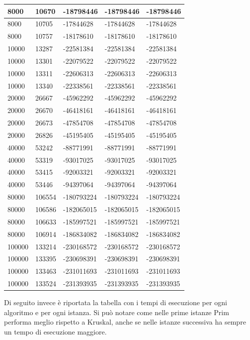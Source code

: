 \begin{longtable}[H]{|p{1.5cm}|p{1.5cm}|p{2cm}|p{3cm}|p{4cm}|}
    8000 & 10670 & -18798446 & -18798446 & -18798446 \\ \hline  
    8000 & 10705 & -17844628 & -17844628 & -17844628 \\ \hline
    8000 & 10757 & -18178610 & -18178610 & -18178610 \\ \hline  
    10000 & 13287 & -22581384 & -22581384 & -22581384 \\ \hline
    10000 & 13301 & -22079522 & -22079522 & -22079522 \\ \hline
    10000 & 13311 & -22606313 & -22606313 & -22606313 \\ \hline
    10000 & 13340 & -22338561 & -22338561 & -22338561 \\ \hline 
    20000 & 26667 & -45962292 & -45962292 & -45962292 \\ \hline
    20000 & 26670 & -46418161 & -46418161 & -46418161 \\ \hline
    20000 & 26673 & -47854708 & -47854708 & -47854708 \\ \hline
    20000 & 26826 & -45195405 & -45195405 & -45195405 \\ \hline
    40000 & 53242 & -88771991 & -88771991 & -88771991 \\ \hline
    40000 & 53319 & -93017025 & -93017025 & -93017025 \\ \hline
    40000 & 53415 & -92003321 & -92003321 & -92003321 \\ \hline
    40000 & 53446 & -94397064 & -94397064 & -94397064 \\ \hline
    80000 & 106554 & -180793224 & -180793224 & -180793224 \\ \hline 
    80000 & 106586 & -182065015 & -182065015 & -182065015 \\ \hline 
    80000 & 106633 & -185997521 & -185997521 & -185997521 \\ \hline
    80000 & 106914 & -186834082 & -186834082 & -186834082 \\ \hline
    100000 & 133214 & -230168572 & -230168572 & -230168572 \\ \hline
    100000 & 133395 & -230698391 & -230698391 & -230698391 \\ \hline
    100000 & 133463 & -231011693 & -231011693 & -231011693 \\ \hline
    100000 & 133524 & -231393935 & -231393935 & -231393935  \\ \hline
\end{longtable}
\newpage
Di seguito invece è riportata la tabella con i tempi di esecuzione per ogni algoritmo e per ogni istanza. Si può notare come nelle prime istanze Prim performa meglio rispetto a Kruskal, anche se nelle istanze successiva ha sempre un tempo di esecuzione maggiore.
